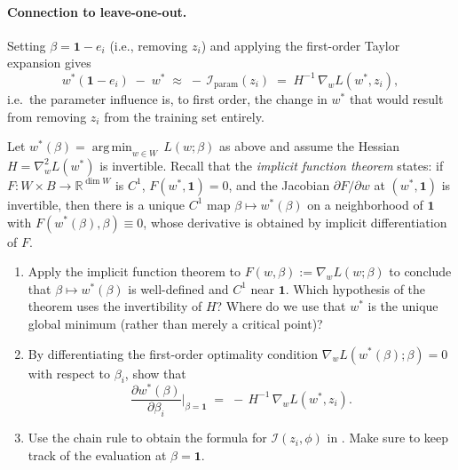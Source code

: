 \documentclass[11pt]{article}
\DeclareMathOperator*{\argmin}{arg\,min}
\begin{document}
\paragraph{Connection to leave-one-out.} Setting $\beta = \mathbf{1} - e_i$ (i.e., removing $z_i$) and applying the first-order Taylor expansion gives
\begin{equation}
  w^*(\mathbf{1} - e_i) \;-\; w^* \;\approx\; -\,\mathcal{I}_{\mathrm{param}}(z_i) \;=\; H^{-1}\,\nabla_w L(w^*,z_i),
  \label{eq:loo-approx}
\end{equation}
i.e.\ the parameter influence is, to first order, the change in $w^*$ that would result from removing $z_i$ from the training set entirely. 

\begin{exercise}\label{ex:if-derive}
Let $w^*(\beta) = \argmin_{w\in W}\,L(w;\beta)$ as above and assume the Hessian $H = \nabla_w^2 L(w^*)$ is invertible. Recall that the \emph{implicit function theorem} states: if $F:W\times B\to\mathbb{R}^{\dim W}$ is $C^1$, $F(w^*,\mathbf{1})=0$, and the Jacobian $\partial F/\partial w$ at $(w^*,\mathbf{1})$ is invertible, then there is a unique $C^1$ map $\beta\mapsto w^*(\beta)$ on a neighborhood of $\mathbf{1}$ with $F(w^*(\beta),\beta)\equiv 0$, whose derivative is obtained by implicit differentiation of $F$.
\begin{enumerate}
  \item Apply the implicit function theorem to $F(w,\beta) := \nabla_w L(w;\beta)$ to conclude that $\beta\mapsto w^*(\beta)$ is well-defined and $C^1$ near $\mathbf{1}$. Which hypothesis of the theorem uses the invertibility of $H$? Where do we use that $w^*$ is the unique global minimum (rather than merely a critical point)?
  \item By differentiating the first-order optimality condition $\nabla_w L(w^*(\beta);\beta)=0$ with respect to $\beta_i$, show that
  \[
    \frac{\partial w^*(\beta)}{\partial \beta_i}\bigg\rvert_{\beta=\mathbf{1}} \;=\; -\,H^{-1}\,\nabla_w L(w^*,z_i).
  \]
  \item Use the chain rule to obtain the formula for $\mathcal{I}(z_i,\phi)$ in . Make sure to keep track of the evaluation at $\beta = \mathbf{1}$.
\end{enumerate}
\end{exercise}
\end{document}
